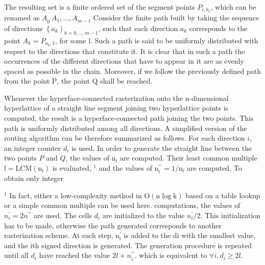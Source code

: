 \begin{CJK}{UTF8}{gbsn}
The resulting set is a finite ordered set of the segment points $P_{i, h_{i}}$, which can be renamed as $A_{0^{\prime}} A_{1}, \ldots, A_{m-1}$ Consider the finite path built by taking the sequence of directions $\left\{a_{k}\right)_{k=0, \ldots, m-1}$, such that each direction $a_{k}$ corresponds to the point $A_{k}=P_{a_{k}, 1}$, for some l. Such a path is said to be uniformly distributed with respect to the directions that constitute it. It is clear that in such a path the occurrences of the different directions that have to appear in it are as evenly spaced as possible in the chain. Moreover, if we follow the previously defined path from the point $\mathrm{P}$, the point $\mathrm{Q}$ shall be reached.

Whenever the hyperface-connected rasterization onto the n-dimensional hyperlattice of a straight line segment joining two hyperlattice points is computed, the result is a hyperface-connected path joining the two points. This path is uniformly distributed among all directions. A simplified version of the routing algorithm can be therefore summarized as follows. For each direction $i$, an integer counter $d_{i}$ is used. In order to generate the straight line between the two points $P$ and $Q$, the values of $\mathrm{n}_{\mathrm{i}}$ are computed. Their least common multiple $\mathrm{l}=\mathrm{LCM}\left(\mathrm{n}_{\mathrm{i}}\right)$ is evaluated, ${ }^{1}$ and the values of $\mathrm{n}_{\mathrm{i}}^{\prime \prime}=1 / \mathrm{n}_{\mathrm{i}}$ are computed. To obtain only integer

${ }^{1}$ In fact, either a low-complexity method in $\mathrm{O}(\mathrm{n} \log \mathrm{k})$ based on a table lookup or a simple common multiple can be used here. computations, the values of $n_{i}^{\prime}=2 n^{\prime \prime}$ are used. The cells $d_{i}$ are initialized to the value $n_{i}^{\prime} / 2$. This initialization has to be made, otherwise the path generated corresponds to another rasterization scheme. At each step, $\mathrm{n}_{\mathrm{i}}^{\prime}$ is added to the di with the smallest value, and the ith signed direction is generated. The generation procedure is repeated until all $d_{i}$ have reached the value $2 l+n_{i}^{\prime \prime}$. which is equivalent to $\forall i, d_{i} \geq 2 l$.\\




\end{CJK}